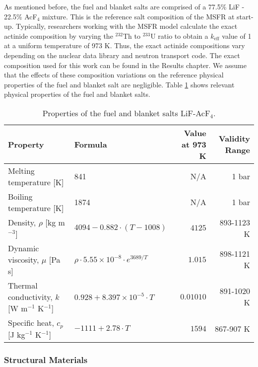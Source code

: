As mentioned before, the fuel and blanket salts are comprised of a 77.5\% LiF
- 22.5\% AcF$_4$ mixture. This is the reference salt composition of the
\gls{MSFR} at start-up. Typically, researchers working with the \gls{MSFR}
model calculate the exact actinide composition by varying the $^{232}$Th to
$^{233}$U ratio to obtain a $k_{\text{eff}}$ value of 1 at a uniform
temperature of 973 K. Thus, the exact actinide compositions vary depending on
the nuclear data library and neutron transport code. The exact composition
used for this work can be found in the Results chapter. We assume that the
effects of these composition variations on the reference physical properties
of the fuel and blanket salt are negligible. Table \ref{table:prip} shows
relevant physical properties of the fuel and blanket salts.
%
\begin{table}[htb!]
\small
\centering
\caption{Properties of the fuel and blanket salts LiF-AcF$_4$.}
\begin{tabular}{l l r r}
\toprule
Property & Formula & {Value at 973 K} & Validity Range\\
\midrule
Melting temperature [K] & 841 & {N/A} & 1 bar \\
Boiling temperature [K] & 1874 & {N/A} & 1 bar \\
Density, $\rho$ [kg m$^{-3}$] & $4094-0.882 \cdot (T-1008)$ & $4125$ & 893-1123 K \\
Dynamic viscosity, $\mu$ [Pa s] & $\rho \cdot 5.55 \times 10^{-8} \cdot e^{3689/T}$ & $1.015$ & 898-1121 K \\
Thermal conductivity, $k$ [W m$^{-1}$ K$^{-1}$] & $0.928+8.397 \times 10^{-5} \cdot T$ & $0.01010$ & 891-1020 K \\
Specific heat, $c_p$ [J kg$^{-1}$ K$^{-1}$] & $-1111+2.78\cdot T$ & $1594$ & 867-907 K \\
\bottomrule
\end{tabular}
\label{table:prip}
\end{table}

\subsubsection{Structural Materials}

